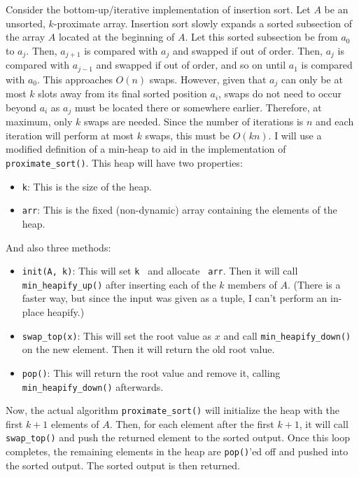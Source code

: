 \documentclass[12pt,twoside]{article}
\begin{document}
\begin{problems}
\begin{problemparts}
\problempart Consider the bottom-up/iterative implementation of insertion
    sort. Let $ A $ be an unsorted, $ k $-proximate array. Insertion sort
    slowly expands a sorted subsection of the array $ A $ located at the
    beginning of $ A $. Let this sorted subsection be from $ a_0 $ to $ a_j
    $. Then, $ a_{j + 1} $ is compared with $ a_j $ and swapped if out of
    order. Then, $ a_j $ is compared with $ a_{j - 1} $ and swapped if out of
    order, and so on until $ a_1 $ is compared with $ a_0 $. This approaches
    $ O(n) $ swaps. However, given that $ a_{j} $ can only be at most $ k $
    slots away from its final sorted position $ a_i $, swaps do not need to
    occur beyond $ a_i $ as $ a_j $ must be located there or somewhere
    earlier. Therefore, at maximum, only $ k $ swaps are needed. Since the
    number of iterations is $ n $ and each iteration will perform at most $ k
    $ swaps, this must be $ O(kn) $.
 I will use a modified definition of a min-heap
    to aid in the implementation of {\tt proximate\_sort()}. This heap will
    have two properties:
    \begin{itemize}
        \item {\tt k}: This is the size of the heap.
        \item {\tt arr}: This is the fixed (non-dynamic) array containing the
        elements of the heap.
    \end{itemize}
    And also three methods:
    \begin{itemize}
        \item {\tt init(A, k)}: This will set {\tt k } and allocate {\tt
        arr}. Then it will call {\tt min\_heapify\_up()} after inserting each
        of the $ k $ members of $ A $. (There is a faster way, but since the
        input was given as a tuple, I can't perform an in-place heapify.)
        \item {\tt swap\_top(x)}: This will set the root value as $ x $ and
        call {\tt min\_heapify\_down()} on the new element. Then it will
        return the old root value.
        \item {\tt pop()}: This will return the root value and remove it,
        calling {\tt min\_heapify\_down()} afterwards.
    \end{itemize}
    Now, the actual algorithm {\tt proximate\_sort()} will initialize the heap
    with the first $ k + 1 $ elements of $ A $. Then, for each element after
    the first $ k + 1 $, it will call {\tt swap\_top()} and push the returned
    element to the sorted output. Once this loop completes, the remaining
    elements in the heap are {\tt pop()}'ed off and pushed into the sorted
    output. The sorted output is then returned.


\end{problemparts}
\end{problems}
\end{document}
